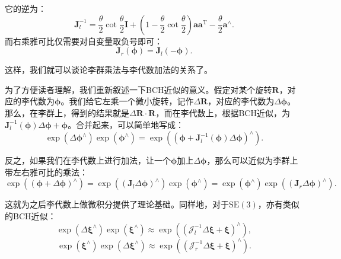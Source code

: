 它的逆为：
\begin{equation}
\bm{J}_l^{ - 1} = \frac{\theta }{2}\cot \frac{\theta }{2} \bm{I} + \left( {1 - \frac{\theta }{2}\cot \frac{\theta }{2}} \right) \bm{a} {\bm{a}^\mathrm{T}} - \frac{\theta }{2}{ \bm{a}^ \wedge }.
\end{equation}
而右乘雅可比仅需要对自变量取负号即可：
\begin{equation}
\bm{J}_r(\boldsymbol{\phi}) =\bm{J}_l(-\boldsymbol{\phi}) .
\end{equation}

这样，我们就可以谈论李群乘法与李代数加法的关系了。

为了方便读者理解，我们重新叙述一下BCH近似的意义。假定对某个旋转$\bm{R}$，对应的李代数为$\boldsymbol{\phi}$。我们给它左乘一个微小旋转，记作$\Delta \bm{R}$，对应的李代数为$\Delta \boldsymbol{\phi}$。那么，在李群上，得到的结果就是$ \Delta \bm{R} \cdot \bm{R}$，而在李代数上，根据BCH近似，为$\bm{J}_l^{-1} (\boldsymbol{\phi}) \Delta \boldsymbol{\phi} + \boldsymbol{\phi}$。合并起来，可以简单地写成：
\begin{equation}
\exp \left( {\Delta { \boldsymbol{\phi} ^ \wedge }} \right)\exp \left( {{ \boldsymbol{\phi} ^ \wedge }} \right) = \exp \left( {{{\left( { \boldsymbol{\phi}  + \bm{J}_l^{ - 1}\left( \boldsymbol{\phi}  \right)\Delta \boldsymbol{\phi} } \right)}^ \wedge }} \right).
\end{equation}

反之，如果我们在李代数上进行加法，让一个$\boldsymbol{\phi}$加上$\Delta \boldsymbol{\phi}$，那么可以近似为李群上带左右雅可比的乘法：
\begin{equation}
\exp \left( {{{\left( { \boldsymbol{\phi}  + \Delta \boldsymbol{\phi} } \right)}^ \wedge }} \right) = \exp \left( {{{\left( {{ \bm{J}_l}\Delta \boldsymbol{\phi} } \right)}^ \wedge }} \right)\exp \left( {{ \boldsymbol{\phi} ^ \wedge }} \right) = \exp \left( {{\boldsymbol{\phi} ^ \wedge }} \right)\exp \left( {{{\left( {{\bm{J}_r}\Delta \boldsymbol{\phi} } \right)}^ \wedge }} \right).
\end{equation}

这就为之后李代数上做微积分提供了理论基础。同样地，对于$\mathrm{SE}(3)$，亦有类似的BCH近似：
\begin{equation}
\exp \left( {\Delta {\boldsymbol{\xi} ^ \wedge }} \right)\exp \left( {{ \boldsymbol{\xi} ^ \wedge }} \right) \approx \exp \left( {{{\left( {{ \bm{\mathcal{J}}_l^{-1} }\Delta \boldsymbol{\xi}  + \boldsymbol{\xi} } \right)}^ \wedge }} \right),
\end{equation}
\begin{equation}
\exp \left( {{ \boldsymbol{\xi} ^ \wedge }} \right) \exp \left( {\Delta {\boldsymbol{\xi} ^ \wedge }} \right)  \approx \exp \left( {{{\left( {{ \bm{\mathcal{J}}_r^{-1} }\Delta \boldsymbol{\xi}  + \boldsymbol{\xi} } \right)}^ \wedge }} \right).
\end{equation}

